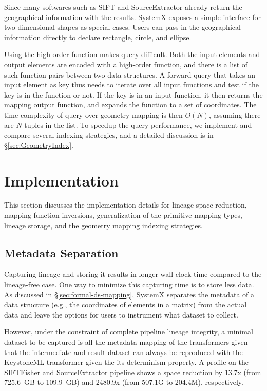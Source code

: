 \documentclass{sig-alternate}
\begin{document}
Since many softwares such as SIFT and SourceExtractor already return the geographical information with the results.
SystemX exposes a simple interface for two dimensional shapes as special cases.
Users can pass in the geographical information directly to declare rectangle, circle, and ellipse.

Using the high-order function makes query difficult. 
Both the input elements and output elements are encoded with a high-order function, 
and there is a list of such function pairs between two data structures.
A forward query that takes an input element as key thus needs to iterate over all input functions and test if the key is in the function or not.
If the key is in an input function, it then returns the mapping output function, and expands the function to a set of coordinates.
The time complexity of query over geometry mapping is then $O(N)$, assuming there are $N$ tuples in the list.
To speedup the query performance, we implement and compare several indexing strategies, and a detailed discussion is in \S\ref{sec:GeometryIndex}.


\section{Implementation}
\label{sec:Impl}
This section discusses the implementation details for lineage space reduction, mapping function inversions, 
generalization of the primitive mapping types, lineage storage, and the geometry mapping indexing strategies.


\subsection{Metadata Separation}
Capturing lineage and storing it results in longer wall clock time compared to the lineage-free case. 
One way to minimize this capturing time is to store less data.
As discussed in \S\ref{sec:formal-ds-mapping}, SystemX separates the metadata of a data structure 
(e.g., the coordinates of elements in a matrix) from the actual data  and leave the options for users to 
instrument what dataset to collect.

However, under the constraint of complete pipeline lineage integrity, a minimal dataset to be captured
is all the metadata mapping of the transformers given that the intermediate and result 
dataset can always be reproduced with the KeystoneML transformer given the its determinism property. 
A profile on the SIFTFisher and SourceExtractor pipeline shows a space reduction by 
13.7x (from 725.6~GB to 109.9~GB) and 2480.9x (from 507.1G to 204.4M), respectively.
\end{document}
